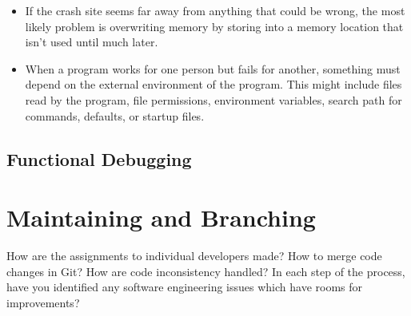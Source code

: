 \documentclass[draftclsnofoot,journal,onecolumn,12pt]{IEEEtran}
\begin{document}
\begin{enumerate}
\begin{itemize}
        \item If the crash site seems far away from anything that could be wrong, the most likely problem is overwriting memory by storing into a memory location that isn't used until much later.
        \item When a program works for one person but fails for another, something must depend on the external environment of the program. This might include files read by the program, file permissions, environment variables, search path for commands, defaults, or startup files.
      \end{itemize}
\end{enumerate}

\subsection{Functional Debugging}

\section{Maintaining and Branching}

How are the assignments to individual developers made? How to merge code changes in Git? How are code inconsistency handled? In each step of the process, have you identified any software engineering issues which have rooms for improvements?
\end{document}
